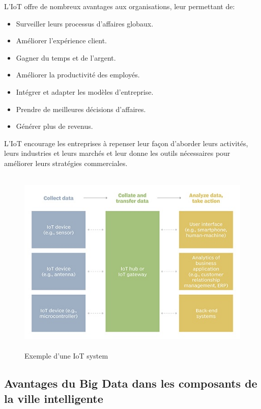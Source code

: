 \documentclass[french, a4paper, 12pt]{report}
\begin{document}
L'IoT offre de nombreux avantages aux organisations, leur permettant de:
\begin{itemize}
\item \textbf{}Surveiller leurs processus d'affaires globaux. 
\item \textbf{}Améliorer l'expérience client.
\item \textbf{}Gagner du temps et de l'argent. 
\item \textbf{}Améliorer la productivité des employés. 
\item \textbf{}Intégrer et adapter les modèles d'entreprise. 
\item \textbf{}Prendre de meilleures décisions d'affaires. 
\item \textbf{}Générer plus de revenus.
\end{itemize}
L'IoT encourage les entreprises à repenser leur façon d'aborder leurs activités, leurs industries et leurs marchés et leur donne les outils nécessaires pour améliorer leurs stratégies commerciales.
\begin{figure}[!ht]
    \centering
    \includegraphics[height=9cm]{images/iot_system.jpg}
    \caption{Exemple d'une IoT system}
    \label{fig:2.2}
\end{figure}
\subsection{Avantages du Big Data dans les composants de la ville intelligente}
\end{document}
